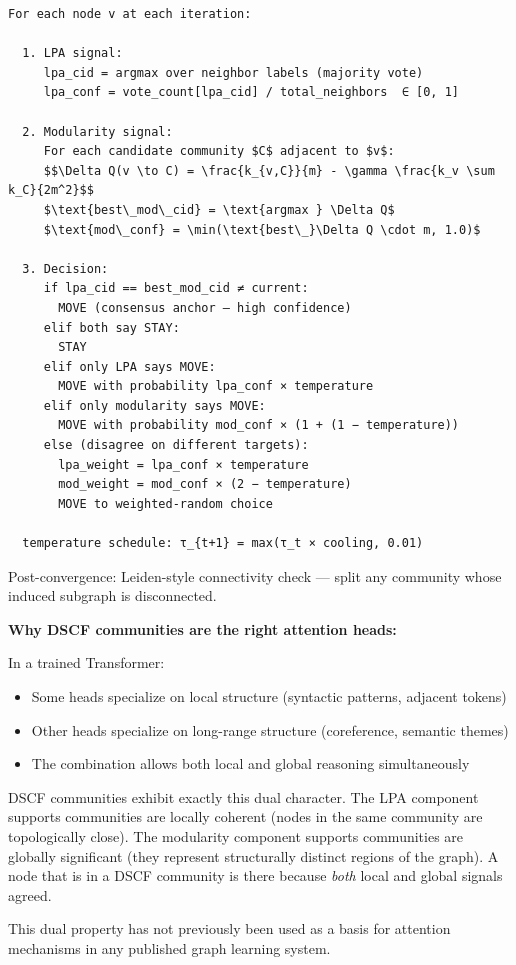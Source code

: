 \documentclass[10pt,journal,compsoc]{IEEEtran}
\begin{document}
\begin{lstlisting}
For each node v at each iteration:

  1. LPA signal:
     lpa_cid = argmax over neighbor labels (majority vote)
     lpa_conf = vote_count[lpa_cid] / total_neighbors  ∈ [0, 1]

  2. Modularity signal:
     For each candidate community $C$ adjacent to $v$:
     $$\Delta Q(v \to C) = \frac{k_{v,C}}{m} - \gamma \frac{k_v \sum k_C}{2m^2}$$
     $\text{best\_mod\_cid} = \text{argmax } \Delta Q$
     $\text{mod\_conf} = \min(\text{best\_}\Delta Q \cdot m, 1.0)$

  3. Decision:
     if lpa_cid == best_mod_cid ≠ current:
       MOVE (consensus anchor — high confidence)
     elif both say STAY:
       STAY
     elif only LPA says MOVE:
       MOVE with probability lpa_conf × temperature
     elif only modularity says MOVE:
       MOVE with probability mod_conf × (1 + (1 − temperature))
     else (disagree on different targets):
       lpa_weight = lpa_conf × temperature
       mod_weight = mod_conf × (2 − temperature)
       MOVE to weighted-random choice

  temperature schedule: τ_{t+1} = max(τ_t × cooling, 0.01)
\end{lstlisting}

Post-convergence: Leiden-style conne\-ctivity check — split any community whose
induced subgraph is disco\-nnected.

\textbf{Why DSCF communities are the right attention heads:}

In a trained Transformer:
\begin{itemize}
\item Some heads specialize on local structure (syntactic patterns, adjacent tokens)
\item Other heads specialize on long-range structure (coreference, semantic themes)
\item The combination allows both local and global reasoning simul\-taneously

\end{itemize}
DSCF communities exhibit exactly this dual character. The LPA component supports
communities are locally coherent (nodes in the same community are topol\-ogically
close). The modularity component supports communities are globally significant
(they represent struc\-turally distinct regions of the graph). A node that is in
a DSCF community is there because \textit{both} local and global signals agreed.

This dual property has not previously been used as a basis for attention
mechanisms in any published graph learning system.
\end{document}
